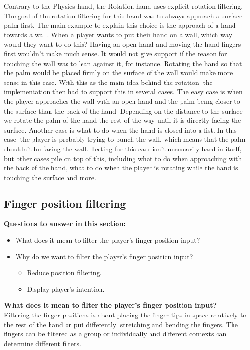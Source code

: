 Contrary to the Physics hand, the Rotation hand uses explicit rotation filtering. The goal of the rotation filtering for this hand was to always approach a surface palm-first. The main example to explain this choice is the approach of a hand towards a wall. When a player wants to put their hand on a wall, which way would they want to do this? Having an open hand and moving the hand fingers first wouldn't make much sense. It would not give support if the reason for touching the wall was to lean against it, for instance. Rotating the hand so that the palm would be placed firmly on the surface of the wall would make more sense in this case. With this as the main idea behind the rotation, the implementation then had to support this in several cases. The easy case is when the player approaches the wall with an open hand and the palm being closer to the surface than the back of the hand. Depending on the distance to the surface we rotate the palm of the hand the rest of the way until it is directly facing the surface. Another case is what to do when the hand is closed into a fist. In this case, the player is probably trying to punch the wall, which means that the palm shouldn't be facing the wall. Testing for this case isn't necessarily hard in itself, but other cases pile on top of this, including what to do when approaching with the back of the hand, what to do when the player is rotating while the hand is touching the surface and more.

\subsection{Finger position filtering}
\label{subsec:categoryFingerFiltering}
\textbf{Questions to answer in this section:}
\begin{itemize}
\setlength\itemsep{-0.1cm}
\item What does it mean to filter the player's finger position input?
\item Why do we want to filter the player's finger position input?
\begin{itemize}
\setlength\itemsep{-0.1cm}
\item Reduce position filtering.
\item Display player's intention.
\end{itemize}
\end{itemize}

\textbf{What does it mean to filter the player's finger position input?}\\
Filtering the finger positions is about placing the finger tips in space relatively to the rest of the hand or put differently; stretching and bending the fingers. The fingers can be filtered as a group or individually and different contexts can determine different filters.

